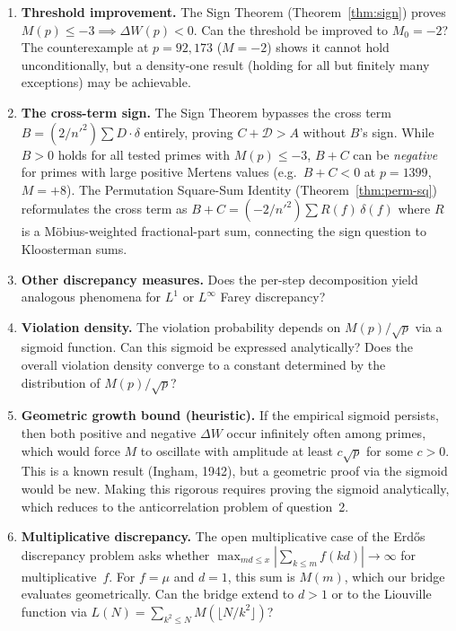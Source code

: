 \documentclass[11pt]{article}
\theoremstyle{definition}
\begin{document}
\begin{enumerate}
  \item \textbf{Threshold improvement.}
    The Sign Theorem (Theorem~\ref{thm:sign}) proves
    $M(p) \le -3 \implies \Delta W(p) < 0$.
    Can the threshold be improved to $M_0 = -2$?
    The counterexample at $p = 92{,}173$ ($M = -2$) shows it
    cannot hold unconditionally, but a density-one result
    (holding for all but finitely many exceptions) may be achievable.

  \item \textbf{The cross-term sign.}
    The Sign Theorem bypasses the cross term $B = (2/n'^2)\sum D
    \cdot \delta$ entirely, proving $C + \mathcal{D} > A$ without
    $B$'s sign.  While $B > 0$ holds
    for all tested primes with $M(p) \le -3$,
    $B + C$ can be \emph{negative} for primes with large positive
    Mertens values (e.g.\ $B + C < 0$ at $p = 1399$, $M = +8$).
    The Permutation Square-Sum Identity
    (Theorem~\ref{thm:perm-sq}) reformulates the cross term as
    $B + C = (-2/{n'}^2)\sum R(f)\,\delta(f)$ where $R$ is a
    M\"obius-weighted fractional-part sum, connecting
    the sign question to Kloosterman sums.

  \item \textbf{Other discrepancy measures.}  Does the per-step
    decomposition yield analogous phenomena for $L^1$ or $L^\infty$
    Farey discrepancy?

  \item \textbf{Violation density.}  The violation probability
    depends on $M(p)/\sqrt{p}$ via a sigmoid function.  Can this
    sigmoid be expressed analytically?  Does the overall violation
    density converge to a constant determined by the distribution
    of $M(p)/\sqrt{p}$?

  \item \textbf{Geometric growth bound (heuristic).}  If the
    empirical sigmoid persists, then both positive and negative
    $\Delta W$ occur infinitely often among primes, which would
    force $M$ to oscillate with amplitude at least
    $c\sqrt{p}$ for some $c > 0$.  This is a known result
    (Ingham, 1942), but a geometric proof via the sigmoid would
    be new.  Making this rigorous requires proving the
    sigmoid analytically, which reduces to the anticorrelation
    problem of question~2.

  \item \textbf{Multiplicative discrepancy.}  The open
    multiplicative case of the Erd\H{o}s discrepancy problem
    asks whether $\max_{md \le x}|\sum_{k \le m}f(kd)|
    \to \infty$ for multiplicative~$f$.  For $f = \mu$ and
    $d = 1$, this sum is $M(m)$, which our bridge evaluates
    geometrically.  Can the bridge extend to $d > 1$ or to
    the Liouville function via
    $L(N) = \sum_{k^2 \le N} M(\lfloor N/k^2 \rfloor)$?


\end{enumerate}
\end{document}
